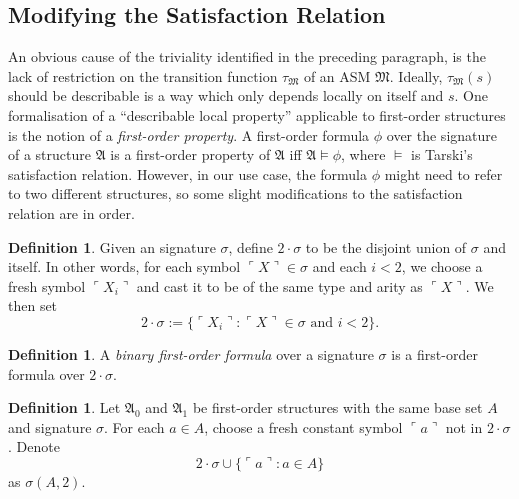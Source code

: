 \documentclass[12pt, twoside]{memoir}
\numberwithin{equation}{section}
\theoremstyle{definition}
\newtheorem{defi}[thm]{Definition}
\theoremstyle{remark}
\theoremstyle{definition}
\theoremstyle{definition}
\theoremstyle{definition}
\theoremstyle{remark}
\begin{document}
\subsection{Modifying the Satisfaction Relation}

An obvious cause of the triviality identified in the preceding paragraph, is the lack of restriction on the transition function $\tau_{\mathfrak{M}}$ of an ASM $\mathfrak{M}$. Ideally, $\tau_{\mathfrak{M}}(s)$ should be describable is a way which only depends locally on itself and $s$. One formalisation of a ``describable local property'' applicable to first-order structures is the notion of a \emph{first-order property}. A first-order formula $\phi$ over the signature of a structure $\mathfrak{A}$ is a first-order property of $\mathfrak{A}$ iff $\mathfrak{A} \models \phi$, where $\models$ is Tarski's satisfaction relation. However, in our use case, the formula $\phi$ might need to refer to two different structures, so some slight modifications to the satisfaction relation are in order.

\begin{defi}
Given an signature $\sigma$, define $2 \cdot \sigma$ to be the disjoint union of $\sigma$ and itself. In other words, for each symbol $\ulcorner X \urcorner \in \sigma$ and each $i < 2$, we choose a fresh symbol $\ulcorner X_{i} \urcorner$ and cast it to be of the same type and arity as $\ulcorner X \urcorner$. We then set
\begin{equation*}
    2 \cdot \sigma := \{\ulcorner X_{i} \urcorner : \ulcorner X \urcorner \in \sigma \text{ and } i < 2\} \text{.}
\end{equation*}
\end{defi}

\begin{defi}
A \emph{binary first-order formula} over a signature $\sigma$ is a first-order formula over $2 \cdot \sigma$.
\end{defi}

\begin{defi}
Let $\mathfrak{A}_0$ and $\mathfrak{A}_1$ be first-order structures with the same base set $A$ and signature $\sigma$. For each $a \in A$, choose a fresh constant symbol $\ulcorner a \urcorner$ not in $2 \cdot \sigma$. Denote
\begin{equation*}
    2 \cdot \sigma \cup \{\ulcorner a \urcorner : a \in A\}
\end{equation*}
as $\sigma(A, 2)$.
\end{defi}
\end{document}
